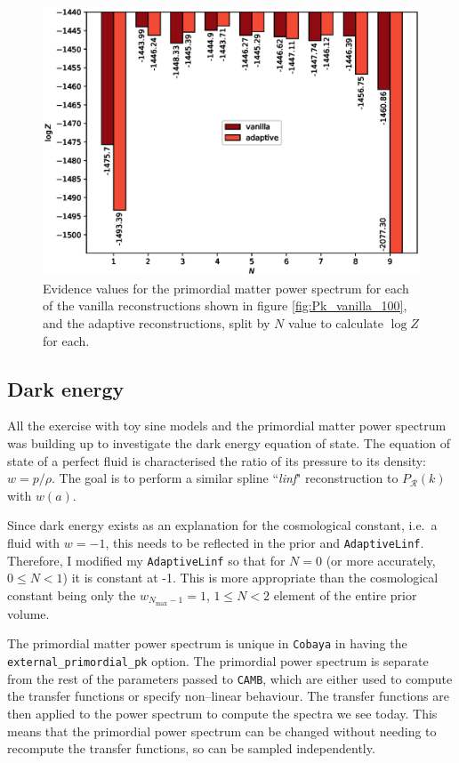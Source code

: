 \documentclass{article}
\begin{document}
\newpage

\begin{figure}[H]
  \centering
  \includegraphics[width=13cm]{PklogZ.eps}
  \caption{Evidence values for the primordial matter power spectrum for each of the vanilla reconstructions shown in figure \ref{fig:Pk_vanilla_100}, and the adaptive reconstructions, split by $N$ value to calculate $\log{Z}$ for each.}
  \label{fig:PklogZ}
\end{figure}

\subsection{Dark energy}
\label{sec:de}

All the exercise with toy sine models and the primordial matter power spectrum was building up to investigate the dark energy equation of state. The equation of state of a perfect fluid is characterised the ratio of its pressure to its density: $w = p/\rho$. The goal is to perform a similar spline ``\textit{linf}" reconstruction to $P_\mathcal R(k)$ with $w(a)$.

Since dark energy exists as an explanation for the cosmological constant, i.e.\ a fluid with $w=-1$, this needs to be reflected in the prior and \texttt{AdaptiveLinf}. Therefore, I modified my \texttt{AdaptiveLinf} so that for $N=0$ (or more accurately, $0\le N <1$) it is constant at -1. This is more appropriate than the cosmological constant being only the $w_{N_\textrm{max}-1} = 1$, $1\le N<2$ element of the entire prior volume.

The primordial matter power spectrum is unique in \texttt{Cobaya} in having the \texttt{external\_primordial\_pk} option. The primordial power spectrum is separate from the rest of the parameters passed to \texttt{CAMB}, which are either used to compute the transfer functions or specify non--linear behaviour. The transfer functions are then applied to the power spectrum to compute the spectra we see today. This means that the primordial power spectrum can be changed without needing to recompute the transfer functions, so can be sampled independently.
\end{document}
